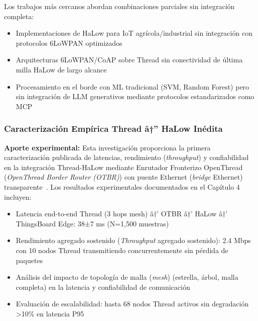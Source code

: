 Los trabajos más cercanos abordan combinaciones parciales sin integración completa:

\begin{itemize}
\item Implementaciones de HaLow para IoT agrícola/industrial sin integración con protocolos 6LoWPAN optimizados~\cite{scharerPushingWiFiHaLow2025,ahmedSoftFarmNetReconfigurableWiFi2023}
\item Arquitecturas 6LoWPAN/CoAP sobre Thread sin conectividad de última milla HaLow de largo alcance~\cite{abood6LoWPANTechnicalFeatures2024,shahinzadehSmartHomeConnectivity2024}
\item Procesamiento en el borde con ML tradicional (SVM, Random Forest) pero sin integración de LLM generativos mediante protocolos estandarizados como MCP~\cite{liangReviewEdgeComputing2024,alsafranChallengesImplementingIoT2025}
\end{itemize}

\subsubsection{Caracterización Empírica Thread â†” HaLow Inédita}

\textbf{Aporte experimental:} Esta investigación proporciona la primera caracterización publicada de latencias, rendimiento (\textit{throughput}) y confiabilidad en la integración Thread-HaLow mediante Enrutador Fronterizo OpenThread (\textit{OpenThread Border Router (OTBR)}) con puente Ethernet (\textit{bridge} Ethernet) transparente~\cite{threadVsZigbeeLatency2024,halowVsLoRaWANComparison2023}. Los resultados experimentales documentados en el Capítulo 4 incluyen:

\begin{itemize}
\item Latencia end-to-end Thread (3 hops mesh) â†’ OTBR â†’ HaLow â†’ ThingsBoard Edge: 38±7 ms (N=1,500 muestras)
\item Rendimiento agregado sostenido (\textit{Throughput} agregado sostenido): 2.4 Mbps con 10 nodos Thread transmitiendo concurrentemente sin pérdida de paquetes
\item Análisis del impacto de topología de malla (\textit{mesh}) (estrella, árbol, malla completa) en la latencia y confiabilidad de comunicación
\item Evaluación de escalabilidad: hasta 68 nodos Thread activos sin degradación >10\% en latencia P95
\end{itemize}

